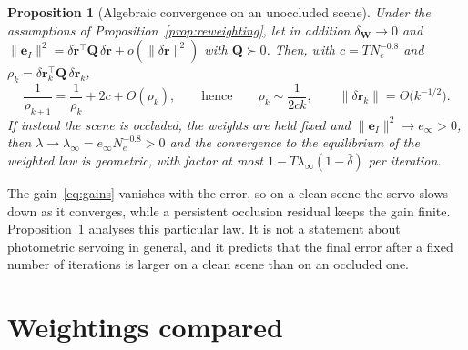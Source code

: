 \documentclass[preprint,12pt]{elsarticle}
\newtheorem{proposition}{Proposition}
\theoremstyle{remark}
\newcommand{\W}{\mathbf{W}}
\newcommand{\e}{\mathbf{e}}
\newcommand{\dr}{\delta\mathbf{r}}
\begin{document}
\begin{proposition}[Algebraic convergence on an unoccluded scene]
\label{prop:rate}
Under the assumptions of Proposition~\ref{prop:reweighting}, let in addition
$\delta_{\W}\to0$ and $\lVert\e_{I}\rVert^{2}=\dr^{\top}\mathbf{Q}\,\dr+o(\lVert\dr\rVert^{2})$
with $\mathbf{Q}\succ0$. Then, with $c=TN_{e}^{-0.8}$ and
$\rho_{k}=\dr_{k}^{\top}\mathbf{Q}\,\dr_{k}$,
\begin{equation}
\frac{1}{\rho_{k+1}}=\frac{1}{\rho_{k}}+2c+O(\rho_{k}),\qquad\text{hence}\qquad
\rho_{k}\sim\frac{1}{2ck},\qquad \lVert\dr_{k}\rVert=\Theta\bigl(k^{-1/2}\bigr).
\label{eq:rate}
\end{equation}
If instead the scene is occluded, the weights are held fixed and
$\lVert\e_{I}\rVert^{2}\to e_{\infty}>0$, then
$\lambda\to\lambda_{\infty}=e_{\infty}N_{e}^{-0.8}>0$ and the convergence to the
equilibrium of the weighted law is geometric, with factor at most
$1-T\lambda_{\infty}(1-\bar\delta)$ per iteration.
\end{proposition}

The gain~\eqref{eq:gains} vanishes with the error, so on a clean scene the
servo slows down as it converges, while a persistent occlusion residual keeps
the gain finite. Proposition~\ref{prop:rate} analyses this particular law. It
is not a statement about photometric servoing in general, and it predicts that
the final error after a fixed number of iterations is larger on a clean scene
than on an occluded one.

\section{Weightings compared}
\label{sec:weightings}
\end{document}
